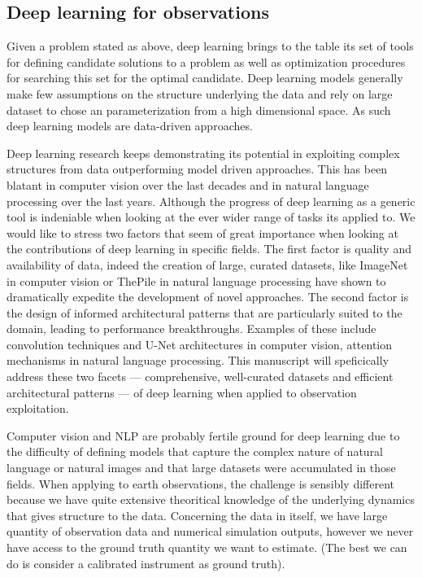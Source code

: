 \begin{bibunit}
\subsection{Deep learning for observations}
Given a problem stated as above, deep learning brings to the table its set of tools for defining candidate solutions to a problem as well as optimization procedures for searching this set for the optimal candidate.
Deep learning models generally make few assumptions on the structure underlying the data and rely on large dataset to chose an parameterization from a high dimensional space. As such deep learning models are data-driven approaches.

Deep learning research keeps demonstrating its potential in exploiting complex structures from data outperforming model driven approaches.
This has been blatant in computer vision over the last decades and in natural language processing over the last years.
Although the progress of deep learning as a generic tool is indeniable when looking at the ever wider range of tasks its applied to.
We would like to stress two factors that seem of great importance when looking at the contributions of deep learning in specific fields.
  The first factor is quality and availability of data, indeed the creation of large, curated datasets, like ImageNet in computer vision or ThePile in natural language processing have shown to dramatically expedite the development of novel approaches. The second factor is the design of informed architectural patterns that are particularly suited to the domain, leading to performance breakthroughs. Examples of these include convolution techniques and U-Net architectures in computer vision, attention mechanisms in natural language processing.
This manuscript will speficically address these two facets — comprehensive, well-curated datasets and efficient architectural patterns — of deep learning when applied to observation exploitation.

Computer vision and NLP are probably fertile ground for deep learning due to the difficulty of defining models that capture the complex nature of natural language or natural images and that large datasets were accumulated in those fields. 
When applying to earth observations, the challenge is sensibly different because we have quite extensive theoritical knowledge of the underlying dynamics that gives structure to the data. Concerning the data in itself, we have large quantity of observation data and numerical simulation outputs, however we never have access to the ground truth quantity we want to estimate. (The best we can do is consider a calibrated instrument as ground truth).



\end{bibunit}
